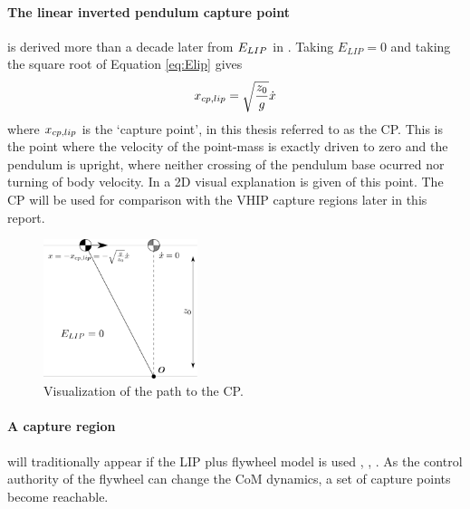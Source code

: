 \paragraph{The linear inverted pendulum capture point} is derived more than a decade later from $E_{LIP}$ in \cite{pratt2006capture}. Taking $E_{LIP}=0$ and taking the square root of Equation \eqref{eq:Elip} gives
\begin{equation}
x_{cp,lip}=\sqrt{ \frac{z_0}{g}}\dot{x} 
\label{eq:cp}
\end{equation}
where $x_{cp,lip}$ is the `capture point', in this thesis referred to as the \ac{CP}. This is the point where the velocity of the point-mass is exactly driven to zero and the pendulum is upright, where neither crossing of the pendulum base ocurred nor turning of body velocity. In  a \ac{2D} visual explanation is given of this point. The \ac{CP} will be used for comparison with the \ac{VHIP} capture regions later in this report.
\begin{figure}
\centering
\includegraphics[width=0.4\textwidth]{STYLESTUFF/2DCP.png}
\caption{Visualization of the path to the \ac{CP}. }
\label{fig:2dicp}
\end{figure}

\paragraph{A capture region} will traditionally appear if the \ac{LIP} plus flywheel model is used \cite{pratt2006capture}, \cite{stephens2007humanoid}, \cite{koolen2012capturability}. As the control authority of the flywheel can change the \ac{CoM} dynamics, a set of capture points become reachable.

